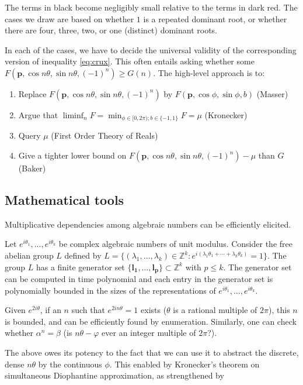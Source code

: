 The terms in black become negligibly small relative to the terms in dark red. The cases we draw are based on whether $1$ is a repeated dominant root, or whether there are four, three, two, or one (distinct) dominant roots.

In each of the cases, we have to decide the universal validity of the corresponding version of inequality \ref{eq:crux}. This often entails asking whether some $F(\mathbf{p}, \cos n\theta, \sin n\theta, (-1)^n) \ge G(n)$. The high-level approach is to:
\begin{enumerate}
\item Replace $F(\mathbf{p}, \cos n\theta, \sin n\theta, (-1)^n)$ by $F(\mathbf{p}, \cos \phi, \sin \phi, b)$ (Masser)
\item Argue that $\liminf_n F = \min_{\phi \in [0, 2\pi); b\in\{-1, 1\}} F = \mu$ (Kronecker)
\item Query $\mu$ (First Order Theory of Reals)
\item Give a tighter lower bound on $F(\mathbf{p}, \cos n\theta, \sin n\theta, (-1)^n) - \mu$ than $G$ (Baker) 
\end{enumerate}

\subsection{Mathematical tools}
Multiplicative dependencies among algebraic numbers can be efficiently elicited. 
 \begin{theorem}
  \label{thm:abelian}
  Let $e^{i \theta_1},...,e^{i \theta_k}$ be complex algebraic numbers of unit modulus. Consider the free abelian group $L$ defined by $L = \{(\lambda_1, \ldots ,\lambda_k) \in \mathbb{Z}^k: 
  e^{i (\lambda_1 \theta_1 + \cdots +  \lambda_k \theta_k)} = 1 \}$. 
  The group $L$ has a finite generator set $\{ \mathbf{l_1}, \ldots, \mathbf{l_p}\} \subset \mathbb{Z}^k$ with $p \le k$. The generator set can be computed in time polynomial and
  each entry in the generator set is polynomially bounded in the sizes of the representations of $e^{i \theta_1},...,e^{i \theta_k}$.
  \end{theorem}
 Given $e^{2i\theta}$, if an $n$ such that $e^{2i n \theta} = 1$ exists ($\theta$ is a rational multiple of $2\pi$), this $n$ is bounded, and can be efficiently found by enumeration. Similarly, one can check whether $\alpha^n = \beta$ (is $n\theta - \varphi$ ever an integer multiple of $2\pi$?). 
 
 The above owes its potency to the fact that we can use it to abstract the discrete, dense $n\theta$ by the continuous $\phi$. This enabled by Kronecker's theorem on simultaneous Diophantine approximation, as strengthened by \cite{joeljames3, ouaknine2014positivity}
 
